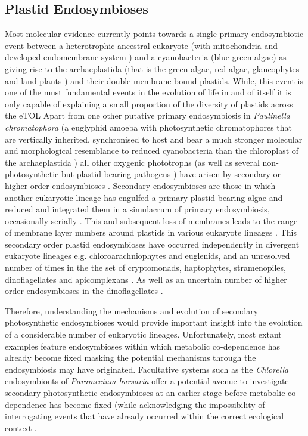 \subsection{Plastid Endosymbioses}
Most molecular evidence currently points towards a single primary endosymbiotic event between a heterotrophic ancestral
eukaryote (with mitochondria and developed endomembrane system \citep{}) and a cyanobacteria (blue-green algae) as giving rise to 
the archaeplastida (that is the green algae, red algae, glaucophytes and land plants \citep{Green2011}) and their double membrane bound plastids.   
While, this event is one of the must fundamental events in the evolution of life in and of itself it is only capable of explaining a small 
proportion of the diversity of plastids across the eTOL \citep{Keeling2013}
Apart from one other putative primary endosymbiosis in \textit{Paulinella chromatophora} (a euglyphid amoeba with photosynthetic 
chromatophores that are vertically inherited, synchronised to host and bear a much stronger molecular and morphological resemblance to reduced 
cyanobacteria than the chloroplast of the archaeplastida \citep{Kies1979,McFadden2014}) all other oxygenic phototrophs 
(as well as several non-photosynthetic but plastid bearing pathogens \citep{}) have arisen by secondary or higher order endosymbioses \citep{Hoshina2009}.
Secondary endosymbioses are those in which another eukaryotic lineage has engulfed a primary plastid bearing algae and reduced and integrated them in a 
simulacrum of primary endosymbiosis, occasionally serially \citep{Keeling2010}. This and subsequent loss of membranes leads to the range of membrane
layer numbers around plastids in various eukaryote lineages \citep{Keeling2013}.  %
This secondary order plastid endosymbioses have occurred independently in divergent eukaryote lineages e.g. chloroarachniophytes and euglenids, and an unresolved
number of times in the the set of cryptomonads, haptophytes, stramenopiles, dinoflagellates and apicomplexans \citep{Keeling2013}.  
As well as an uncertain number of higher order endosymbioses in the dinoflagellates \citep{Keeling2013}.

Therefore, understanding the mechanisms and evolution of secondary photosynthetic endosymbioses would provide important insight into the evolution of a considerable number of eukaryotic lineages.  Unfortunately, most extant examples feature endosymbioses within which metabolic co-dependence has already become fixed
masking the potential mechanisms through the endosymbiosis may have originated.  
Facultative systems such as the \textit{Chlorella} endosymbionts of \textit{Paramecium bursaria} offer a potential avenue to investigate secondary 
photosynthetic endosymbioses at an earlier stage before metabolic co-dependence has become fixed (while acknowledging the impossibility of 
interrogating events that have already occurred within the correct ecological context .

